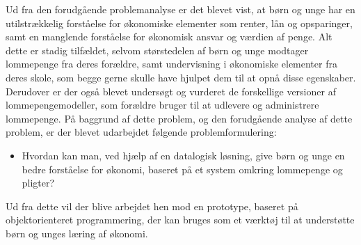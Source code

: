 Ud fra den forudgående problemanalyse er det blevet vist, at børn og unge har en utilstrækkelig forståelse for økonomiske elementer som renter, lån og opsparinger, samt en manglende forståelse for økonomisk ansvar og værdien af penge. Alt dette er stadig tilfældet, selvom størstedelen af børn og unge modtager lommepenge fra deres forældre, samt undervisning i økonomiske elementer fra deres skole, som begge gerne skulle have hjulpet dem til at opnå disse egenskaber. Derudover er der også blevet undersøgt og vurderet de forskellige versioner af lommepengemodeller, som forældre bruger til at udlevere og administrere lommepenge. På baggrund af dette problem, og den forudgående analyse af dette problem, er der blevet udarbejdet følgende problemformulering:

\begin{itemize}
\item Hvordan kan man, ved hjælp af en datalogisk løsning, give børn og unge en bedre forståelse for økonomi, baseret på et system omkring lommepenge og pligter?
\end{itemize}

Ud fra dette vil der blive arbejdet hen mod en prototype, baseret på objektorienteret programmering, der kan bruges som et værktøj til at understøtte børn og unges læring af økonomi.